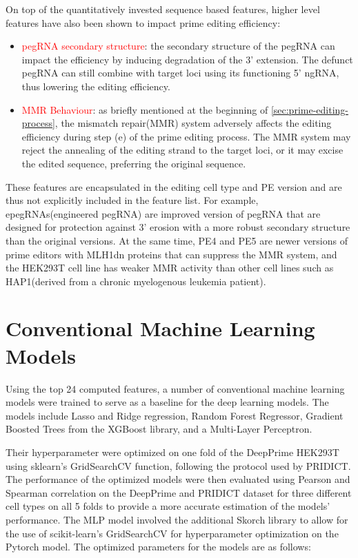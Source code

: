 On top of the quantitatively invested sequence based features, higher level features have also been shown to impact prime editing efficiency:
\begin{itemize}[itemsep=-0mm]
    \item \textcolor{red}{pegRNA secondary structure}: the secondary structure of the pegRNA can impact the efficiency by inducing degradation of the 3' extension. The defunct pegRNA can still combine with target loci using its functioning 5' ngRNA, thus lowering the editing efficiency\cite{nelsonEngineeredPegRNAsImprove2022}.
    \item \textcolor{red}{MMR Behaviour}: as briefly mentioned at the beginning of \autoref{sec:prime-editing-process}, the mismatch repair(MMR) system adversely affects the editing efficiency during step (e) of the prime editing process. The MMR system may reject the annealing of the editing strand to the target loci, or it may excise the edited sequence, preferring the original sequence\cite{chenEnhancedPrimeEditing2021}. 
\end{itemize}

These features are encapsulated in the editing cell type and PE version and are thus not explicitly included in the feature list. For example, epegRNAs(engineered pegRNA) are improved version of pegRNA that are designed for protection against 3' erosion with a more robust secondary structure than the original versions\cite{nelsonEngineeredPegRNAsImprove2022}. At the same time, PE4 and PE5 are newer versions of prime editors with MLH1dn proteins that can suppress the MMR system\cite{chenEnhancedPrimeEditing2021}, and the HEK293T cell line has weaker MMR activity than other cell lines such
as HAP1(derived from a chronic myelogenous leukemia patient)\cite{mathisPredictingPrimeEditing2023}. 


\section{Conventional Machine Learning Models}
\label{sec:conventional-ml}

Using the top 24 computed features, a number of conventional machine learning models were trained to serve as a baseline for the deep learning models. The models include Lasso and Ridge regression, Random Forest Regressor, Gradient Boosted Trees from the XGBoost library, and a Multi-Layer Perceptron.

Their hyperparameter were optimized on one fold of the DeepPrime HEK293T using sklearn's GridSearchCV function, following the protocol used by PRIDICT. The performance of the optimized models were then evaluated using Pearson and Spearman correlation on the DeepPrime and PRIDICT dataset for three different cell types on all 5 folds to provide a more accurate estimation of the models' performance. The MLP model involved the additional Skorch library to allow for the use of scikit-learn's GridSearchCV for hyperparameter optimization on the Pytorch model. The optimized parameters for the models are as follows:


